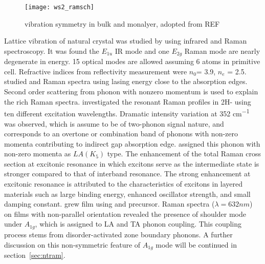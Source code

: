 \begin{figure}[htb]
\centering
\texttt{[image: ws2\_ramsch]}
\caption[ vibration symmetry]{ vibration symmetry in bulk and monalyer, adopted from REF\cite{Ghorbani-asl}}
\label{fig:ws2ramsch}
\end{figure}

Lattice vibration of natural  crystal was studied by \citeauthor{Wieting1971} using infrared and Raman spectroscopy.\cite{Wieting1971} It was found the $E_{1u}$ IR mode and one $E_{2g}$ Raman mode are nearly degenerate in energy. 15 optical modes are allowed assuming 6 atoms in primitive cell. Refractive indices from reflectivity measurement were $n_0$= 3.9, $n_e$ = 2.5. \citeauthor{Stacy1985} studied  and  Raman spectra using lasing energy close to the absorption edges.\cite{Stacy1985} Second order scattering from phonon with nonzero momentum is used to explain the rich Raman spectra. \citeauthor{Sourisseau1991} investigated the resonant Raman profiles in 2H- using ten different excitation wavelengths.\cite{Sourisseau1991} Dramatic intensity variation at 352 \si{cm^{-1}} was observed, which is assume to be of two-phonon signal nature, and corresponds to an overtone or combination band of phonons with non-zero momenta contributing to indirect gap absorption edge. \citeauthor{Sourisseau1991} assigned this phonon with non-zero momenta as $LA(K_5)$ type. The enhancement of the total Raman cross section at excitonic resonance in which excitons serve as the intermediate state is stronger compared to that of interband resonance. The strong enhancement at excitonic resonance is attributed to the characteristics of excitons in layered materials such as large binding energy, enhanced oscillator strength, and small damping constant.\cite{Zhao2013} \citeauthor{Chung1998} grew  film using  and  precursor.\cite{Chung1998} Raman spectra ($\lambda=632 nm$) on films with non-parallel orientation revealed the presence of shoulder mode under $A_{1g}$, which is assigned to LA and TA phonon coupling. This coupling process stems from disorder-activated zone boundary phonons. A further discussion on this non-symmetric feature of $A_{1g}$ mode will be continued in section~\ref{sec:ntram}.

